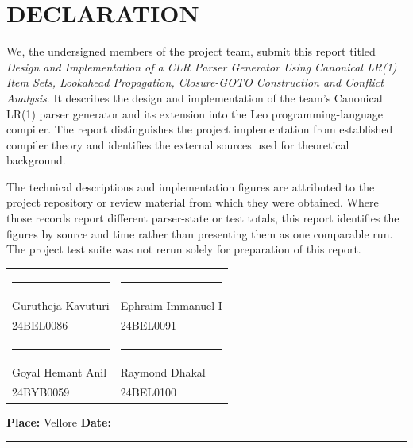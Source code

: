 \documentclass[12pt,a4paper,oneside]{report}
\newcommand{\placeholderline}{\rule{0.34\textwidth}{0.4pt}}
\begin{document}
\chapter*{DECLARATION}
We, the undersigned members of the project team, submit this report titled \emph{Design and Implementation of a CLR Parser Generator Using Canonical LR(1) Item Sets, Lookahead Propagation, Closure-GOTO Construction and Conflict Analysis}. It describes the design and implementation of the team's Canonical LR(1) parser generator and its extension into the Leo programming-language compiler. The report distinguishes the project implementation from established compiler theory and identifies the external sources used for theoretical background.\par
\vspace{0.7cm}
The technical descriptions and implementation figures are attributed to the project repository or review material from which they were obtained. Where those records report different parser-state or test totals, this report identifies the figures by source and time rather than presenting them as one comparable run. The project test suite was not rerun solely for preparation of this report.\par
\vspace{1cm}
\begin{tabularx}{\textwidth}{>{\centering\arraybackslash}X >{\centering\arraybackslash}X}
\placeholderline & \placeholderline\\
Gurutheja Kavuturi & Ephraim Immanuel I\\
24BEL0086 & 24BEL0091\\[1.1cm]
\placeholderline & \placeholderline\\
Goyal Hemant Anil & Raymond Dhakal\\
24BYB0059 & 24BEL0100\\
\end{tabularx}
\vfill
\textbf{Place:} Vellore \hfill \textbf{Date:} \placeholderline
\clearpage
\end{document}

